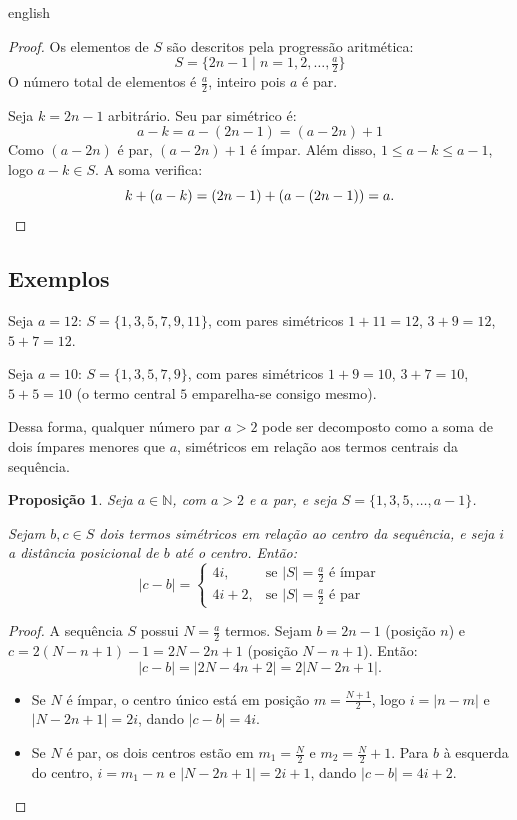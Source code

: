 \documentclass[a4paper,11pt]{article}
\newtheorem{proposition}[theorem]{Proposição}
\theoremstyle{definition}
\theoremstyle{remark}
\begin{document}
\begin{otherlanguage*}{english}
		\begin{proof}
			Os elementos de $S$ são descritos pela progressão aritmética:
			\[
			S = \{2n - 1 \mid n = 1, 2, \dotsc, \tfrac{a}{2}\}
			\]
			O número total de elementos é $\tfrac{a}{2}$, inteiro pois $a$ é par.
			
			Seja $k = 2n - 1$ arbitrário. Seu par simétrico é:
			\[
			a - k = a - (2n - 1) = (a - 2n) + 1
			\]
			Como $(a - 2n)$ é par, $(a - 2n) + 1$ é ímpar. Além disso,
			$1 \leq a - k \leq a - 1$, logo $a - k \in S$. A soma verifica:
			\[
			k + (a - k) = (2n - 1) + (a - (2n - 1)) = a. \qedhere
			\]
		\end{proof}
		
		\subsection{Exemplos}
		
		Seja $a = 12$: $S = \{1, 3, 5, 7, 9, 11\}$, com pares simétricos $1+11=12$,
		$3+9=12$, $5+7=12$.
		
		Seja $a = 10$: $S = \{1, 3, 5, 7, 9\}$, com pares simétricos $1+9=10$,
		$3+7=10$, $5+5=10$ (o termo central $5$ emparelha-se consigo mesmo).
		
		Dessa forma, qualquer número par $a > 2$ pode ser decomposto como a soma de
		dois ímpares menores que $a$, simétricos em relação aos termos centrais da
		sequência.
		
		\begin{proposition}\label{prop:distancia_simetrica}
			Seja $a \in \mathbb{N}$, com $a > 2$ e $a$ par, e seja
			$S = \{1, 3, 5, \dotsc, a - 1\}$.
			
			Sejam $b, c \in S$ dois termos simétricos em relação ao centro da sequência,
			e seja $i$ a distância posicional de $b$ até o centro. Então:
			\[
			|c - b| =
			\begin{cases}
				4i, & \text{se } |S| = \frac{a}{2} \text{ é ímpar} \\
				4i + 2, & \text{se } |S| = \frac{a}{2} \text{ é par}
			\end{cases}
			\]
		\end{proposition}
		
		\begin{proof}
			A sequência $S$ possui $N = \frac{a}{2}$ termos. Sejam $b = 2n-1$ (posição
			$n$) e $c = 2(N-n+1)-1 = 2N-2n+1$ (posição $N-n+1$). Então:
			\[
			|c - b| = |2N - 4n + 2| = 2|N - 2n + 1|.
			\]
			\begin{itemize}
				\item Se $N$ é ímpar, o centro único está em posição $m = \frac{N+1}{2}$,
				logo $i = |n - m|$ e $|N - 2n + 1| = 2i$, dando $|c-b| = 4i$.
				\item Se $N$ é par, os dois centros estão em $m_1 = \frac{N}{2}$ e
				$m_2 = \frac{N}{2}+1$. Para $b$ à esquerda do centro,
				$i = m_1 - n$ e $|N - 2n + 1| = 2i+1$, dando $|c-b| = 4i+2$.
				\qedhere
			\end{itemize}
		\end{proof}
		

\end{otherlanguage*}
\end{document}
